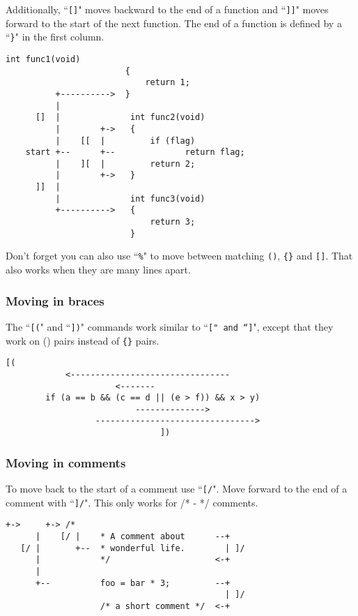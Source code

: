 Additionally, ``\texttt{[]}" moves backward to the end of a function and ``\texttt{]]}" moves forward to the start of the next function.
The end of a function is defined by a ``\texttt{\}}" in the first column.

\begin{Verbatim}[samepage=true]
                        int func1(void)
                        {
                            return 1;
          +---------->  }
          |
      []  |              int func2(void)
          |        +->   {
          |    [[  |         if (flag)
    start +--      +--              return flag;
          |    ][  |         return 2;
          |        +->   }
      ]]  |
          |              int func3(void)
          +---------->   {
                             return 3;
                         }
\end{Verbatim}

Don't forget you can also use ``\texttt{\%}" to move between matching \texttt{()}, \texttt{\{\}} and \texttt{[]}.
That also works when they are many lines apart.
\subsubsection{Moving in braces}
The ``\texttt{[(}" and ``\texttt{])}" commands work similar to ``\texttt{[{}" and ``\texttt{]}}", except that they work on () pairs instead of \texttt{\{\}} pairs.

\begin{Verbatim}[samepage=true]
                          [(
            <--------------------------------
                      <-------
        if (a == b && (c == d || (e > f)) && x > y)
                          -------------->
                  -------------------------------->
                               ])
\end{Verbatim}

\subsubsection{Moving in comments}
To move back to the start of a comment use ``\texttt{[/}".
Move forward to the end of a comment with ``\texttt{]/}".
This only works for /* - */ comments.

\begin{Verbatim}[samepage=true]
      +->     +-> /*
      |    [/ |    * A comment about      --+
   [/ |       +--  * wonderful life.        | ]/
      |            */                     <-+
      |
      +--          foo = bar * 3;         --+
                                            | ]/
                   /* a short comment */  <-+
\end{Verbatim}
